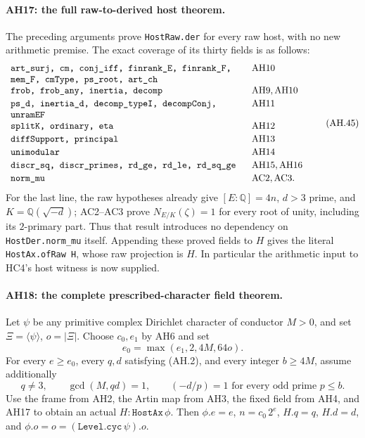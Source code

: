 \paragraph{AH17: the full raw-to-derived host theorem.}
The preceding arguments prove \texttt{HostRaw.der} for every raw host,
with no new arithmetic premise. The exact coverage of its thirty fields
is as follows:
\[
\begin{array}{p{0.72\linewidth}l}
\texttt{art\_surj, cm, conj\_iff, finrank\_E, finrank\_F, mem\_F,
cmType, ps\_root, art\_ch}&\mathrm{AH10}\\[2pt]
\texttt{frob, frob\_any, inertia, decomp}&\mathrm{AH9,AH10}\\[2pt]
\texttt{ps\_d, inertia\_d, decomp\_typeI, decompConj, unramEF}
 &\mathrm{AH11}\\[2pt]
\texttt{splitK, ordinary, eta}&\mathrm{AH12}\\[2pt]
\texttt{diffSupport, principal}&\mathrm{AH13}\\[2pt]
\texttt{unimodular}&\mathrm{AH14}\\[2pt]
\texttt{discr\_sq, discr\_primes, rd\_ge, rd\_le, rd\_sq\_ge}
 &\mathrm{AH15,AH16}\\[2pt]
\texttt{norm\_mu}&\mathrm{AC2,AC3}.
\end{array}                                                     \tag{AH.45}
\]
For the last line, the raw hypotheses already give
$[E:\mathbb Q]=4n$, $d>3$ prime, and $K=\mathbb Q(\sqrt{-d})$;
AC2--AC3 prove $N_{E/K}(\zeta)=1$ for every root of unity, including its
$2$-primary part. Thus that result introduces no dependency on
\texttt{HostDer.norm\_mu} itself. Appending these proved fields to $H$
gives the literal \texttt{HostAx.ofRaw H}, whose raw projection is $H$.
In particular the arithmetic input to HC4's host witness is now supplied.

\paragraph{AH18: the complete prescribed-character field theorem.}
Let $\psi$ be any primitive complex Dirichlet character of conductor $M>0$,
and set $\Xi=\langle\psi\rangle$, $o=|\Xi|$. Choose $c_0,e_1$ by AH6
and set
\[
                   e_0=\max(e_1,2,4M,64o).       \tag{AH.46}
\]
For every $e\ge e_0$, every $q,d$ satisfying (AH.2), and every integer
$b\ge4M$, assume additionally
\[
 q\ne3,\qquad \gcd(M,qd)=1,\qquad
 (-d/p)=1\text{ for every odd prime }p\le b.     \tag{AH.47}
\]
Use the frame from AH2, the Artin map from AH3, the fixed field from AH4,
and AH17 to obtain an actual $H:\texttt{HostAx}\,\phi$.
Then $\phi.e=e$, $n=c_0\,2^e$, $H.q=q$, $H.d=d$, and
$\phi.o=o=(\texttt{Level.cyc}\,\psi).o$.

